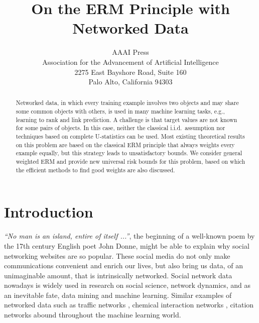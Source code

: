 \documentclass[letterpaper]{article} %
\begin{document}
\title{On the ERM Principle with Networked Data}
\author{AAAI Press\\
Association for the Advancement of Artificial Intelligence\\
2275 East Bayshore Road, Suite 160\\
Palo Alto, California 94303\\
}
\maketitle

\begin{abstract}
Networked data, in which every training example involves two objects and may share some common objects with others, is used in many machine learning tasks, e.g., learning to rank and link prediction. 
A challenge is that target values are not known for some pairs of objects. 
In this case, neither the classical i.i.d.\ assumption nor techniques based on complete U-statistics can be used. 
Most existing theoretical results on this problem are based on the classical ERM principle that always weights every example equally, but this strategy leads to unsatisfactory bounds. 
We consider general weighted ERM and provide new universal risk bounds for this problem, based on which the efficient methods to find good weights are also discussed. 
\end{abstract}

\section{Introduction}
\label{sec:introduction}
\textit{``No man is an island, entire of itself ...''}, the beginning of a well-known poem by the 17th century English poet John Donne, might be able to explain why social networking websites are so popular. 
These social media do not only make communications convenient and enrich our lives, but also bring us data, of an unimaginable amount, that is intrinsically networked. 
Social network data nowadays is widely used in research on social science, network dynamics, and as an inevitable fate, data mining and machine learning.
Similar examples of networked data such as traffic networks \cite{min2011real}, chemical interaction networks \cite{letovsky2003predicting}, citation networks \cite{mcgovern2003exploiting} abound throughout the machine learning world. 
\end{document}
